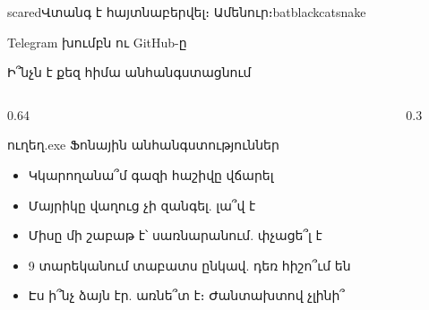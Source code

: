 
%
  {    }%
  {scared}{Վտանգ է հայտնաբերվել։ Ամենուր։}{{bat}{blackcat}{snake}}

\begin{frame}{Telegram խումբն ու GitHub-ը}
  \telegramframebody
\end{frame}

\begin{frame}{Ի՞նչն է քեզ հիմա անհանգստացնում}
  \begin{columns}[c]
    \begin{column}{0.64\textwidth}
      \begin{popup}{ուղեղ.exe}
        {\blackfont Ֆոնային անհանգստություններ}
        \begin{itemize}
          \item<2-> Կկարողանա՞մ գազի հաշիվը վճարել
          \item<3-> Մայրիկը վաղուց չի զանգել. լա՞վ է
          \item<4-> Միսը մի շաբաթ է՝ սառնարանում. փչացե՞լ է
          \item<5-> 9 տարեկանում տաբատս ընկավ. դեռ հիշո՞ւմ են
          \item<6-> Էս ի՞նչ ձայն էր. առնե՞տ է։ Ժանտախտով չլինի՞
        \end{itemize}
        \vspace{-1mm}
      \end{popup}
    \end{column}
    \begin{column}{0.3\textwidth}
      \centering
    \end{column}
  \end{columns}
\end{frame}


